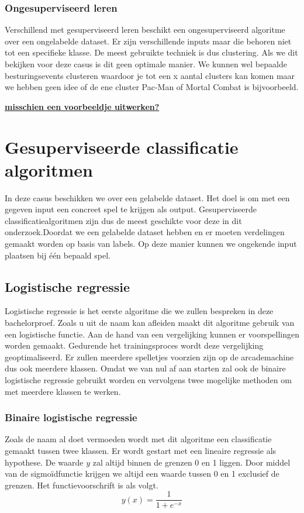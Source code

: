 \subsubsection*{Ongesuperviseerd leren}
\label{sec: ongesuperviseerd-leren}
Verschillend met gesuperviseerd leren beschikt een ongesuperviseerd algoritme over een ongelabelde dataset. Er zijn verschillende inputs maar die behoren niet tot een specifieke klasse. De meest gebruikte techniek is dus clustering. Als we dit bekijken voor deze casus is dit geen optimale manier. We kunnen wel bepaalde besturingsevents clusteren waardoor je tot een x aantal clusters kan komen maar we hebben geen idee of de ene cluster Pac-Man of Mortal Combat is bijvoorbeeld. 


\textbf{\underline{{\Large misschien een voorbeeldje uitwerken? }}}

\section{Gesuperviseerde classificatie algoritmen}
\label{sec:gesuperviseerde-classificatie-algoritmen}

In deze casus beschikken we over een gelabelde dataset. Het doel is om met een gegeven input een concreet spel te krijgen als output. Gesuperviseerde classificatiealgoritmen zijn dus de meest geschikte voor deze in dit onderzoek.Doordat we een gelabelde dataset hebben en er moeten verdelingen gemaakt worden op basis van labels. Op deze manier kunnen we ongekende input plaatsen bij één bepaald spel.

\subsection{Logistische regressie}
\label{sec:logistische-regressie}

Logistische regressie is het eerste algoritme die we zullen bespreken in deze bachelorproef. Zoals u uit de naam kan afleiden maakt dit algoritme gebruik van een logistische functie. Aan de hand van een vergelijking kunnen er voorspellingen worden gemaakt. Gedurende het trainingsproces wordt deze vergelijking geoptimaliseerd. Er zullen meerdere spelletjes voorzien zijn op de arcademachine dus ook meerdere klassen. Omdat we van nul af aan starten zal ook de binaire logistische regressie gebruikt worden en vervolgens twee mogelijke methoden om met meerdere klassen te werken. 

\subsubsection{Binaire logistische regressie}
\label{sec:Binaire-logistische-regressie}
Zoals de naam al doet vermoeden wordt met dit algoritme een classificatie gemaakt tussen twee klassen. 
Er wordt gestart met een lineaire regressie als hypothese. De waarde $y$ zal altijd binnen de grenzen 0 en 1 liggen.  Door middel van de sigmoïdfunctie krijgen we altijd een waarde tussen 0 en 1 exclusief de grenzen. Het functievoorschrift is als volgt. 
$$
y(x) = {\frac{1}{1+e^{-x}}}
$$







